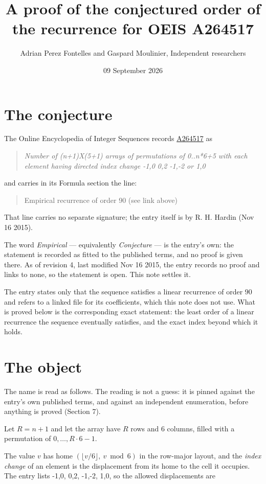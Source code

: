 \documentclass[11pt]{article}
\title{A proof of the conjectured order of the recurrence for OEIS A264517}
\author{Adrian Perez Fontelles and Gaspard Moulinier, Independent researchers}
\date{09 September 2026}
\theoremstyle{definition}
\begin{document}
\maketitle
\section{The conjecture}

The Online Encyclopedia of Integer Sequences records \href{https://oeis.org/A264517}{A264517} as

\begin{quote}\itshape Number of (n+1)X(5+1) arrays of permutations of 0..n*6+5 with each element having directed index change -1,0 0,2 -1,-2 or 1,0\end{quote}

and carries in its Formula section the line:

\begin{quote}\ttfamily Empirical recurrence of order 90 (see link above)\end{quote}

That line carries no separate signature; the entry itself is by R. H. Hardin (Nov 16 2015).

The word {\itshape Empirical} --- equivalently {\itshape Conjecture} --- is the entry's own: the statement is recorded as fitted to the published terms, and no proof is given there. As of revision 4, last modified Nov 16 2015, the entry records no proof and links to none, so the statement is open. This note settles it.

The entry states only that the sequence satisfies a linear recurrence of order $90$ and refers to a linked file for its coefficients, which this note does not use. What is proved below is the corresponding exact statement: the least order of a linear recurrence the sequence eventually satisfies, and the exact index beyond which it holds.

\section{The object}

The name is read as follows. The reading is not a guess: it is pinned against the entry's own published terms, and against an independent enumeration, before anything is proved (Section 7).

Let $R = n + 1$ and let the array have $R$ rows and $6$ columns, filled with a permutation of $0,\dots,R\cdot6-1$.

The value $v$ has home $(\lfloor v/6\rfloor,\ v \bmod 6)$ in the row-major layout, and the {\itshape index change} of an element is the displacement from its home to the cell it occupies. The entry lists -1,0, 0,2, -1,-2, 1,0, so the allowed displacements are
\end{document}
